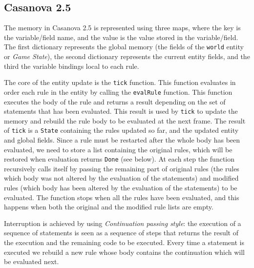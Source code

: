 \subsection{Casanova 2.5}
The memory in Casanova 2.5 is represented using three maps, where the key is the variable/field name, and the value is the value stored in the variable/field. The first dictionary represents the global memory (the fields of the \texttt{world} entity or \textit{Game State}), the second dictionary represents the current entity fields, and the third the variable bindings local to each rule.

The core of the entity update is the \texttt{tick} function. This function evaluates in order each rule in the entity by calling the \texttt{evalRule} function. This function executes the body of the rule and returns a result depending on the set of statements that has been evaluated. This result is used by \texttt{tick} to update the memory and rebuild the rule body to be evaluated at the next frame. The result of \texttt{tick} is a \texttt{State} containing the rules updated so far, and the updated entity and global fields. Since a rule must be restarted after the whole body has been evaluated, we need to store a list containing the original rules, which will be restored when evaluation returns \texttt{Done} (see below). At each step the function recursively calls itself by passing the remaining part of original rules (the rules which body was not altered by the evaluation of the statements) and modified rules (which body has been altered by the evaluation of the statements) to be evaluated. The function stops when all the rules have been evaluated, and this happens when both the original and the modified rule lists are empty.

Interruption is achieved by using \textit{Continuation passing style}: the execution of a sequence of statements is seen as a sequence of steps that returns the result of the execution and the remaining code to be executed. Every time a statement is executed we rebuild a new rule whose body contains the continuation which will be evaluated next. 

